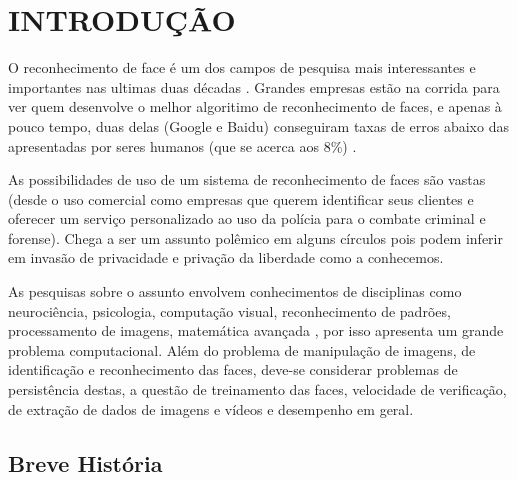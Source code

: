 
\chapter{INTRODUÇÃO}\label{ch:introducao}

O reconhecimento de face é um dos campos de pesquisa mais interessantes e importantes nas ultimas duas décadas \cite{wei_lun}. Grandes empresas estão na corrida para ver quem desenvolve o melhor algoritimo de reconhecimento de faces, e apenas à pouco tempo, duas delas (Google e Baidu) conseguiram taxas de erros abaixo das apresentadas por seres humanos (que se acerca aos 8\%) \cite{stats_economy_compass_2017}.

As possibilidades de uso de um sistema de reconhecimento de faces são vastas (desde o uso comercial como empresas que querem identificar seus clientes e oferecer um serviço personalizado ao uso da polícia para o combate criminal e forense). Chega a ser um assunto polêmico em alguns círculos pois podem inferir em invasão de privacidade e privação da liberdade como a conhecemos.

As pesquisas sobre o assunto envolvem conhecimentos de disciplinas como neurociência, psicologia, computação visual, reconhecimento de padrões, processamento de imagens, matemática avançada \cite{wei_lun}, por isso apresenta um grande problema computacional. Além do problema de manipulação de imagens,  de identificação e reconhecimento das faces, deve-se considerar problemas de persistência destas, a questão de treinamento das faces, velocidade de verificação, de extração de dados de imagens e vídeos e desempenho em geral.


\section{Breve História}\label{sec:historia}

